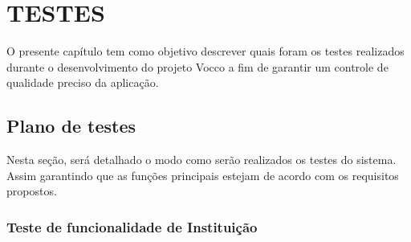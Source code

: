\label{testes}
\chapter{TESTES}

O presente capítulo tem como objetivo descrever quais foram os testes realizados durante o desenvolvimento do projeto Vocco a fim de garantir um controle de qualidade preciso da aplicação.

\section{Plano de testes}
 Nesta seção, será detalhado o modo como serão realizados os testes do sistema. Assim garantindo que as funções principais estejam de acordo com os requisitos propostos.

 \subsection{Teste de funcionalidade de Instituição}
 
